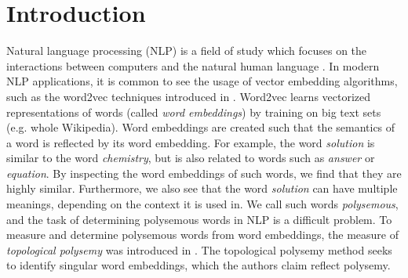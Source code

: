 \chapter{Introduction}
\label{chap:introduction}
Natural language processing (NLP) is a field of study which focuses on the interactions between computers and the natural human language \cite{Allen2003NLP}. In modern NLP applications, it is common to see the usage of vector embedding algorithms, such as the word2vec techniques introduced in \cite{mikolov2013a}. Word2vec learns vectorized representations of words (called \textit{word embeddings}) by training on big text sets (e.g. whole Wikipedia). Word embeddings are created such that the semantics of a word is reflected by its word embedding. For example, the word \textit{solution} is similar to the word \textit{chemistry}, but is also related to words such as \textit{answer} or \textit{equation}. By inspecting the word embeddings of such words, we find that they are highly similar. Furthermore, we also see that the word \textit{solution} can have multiple meanings, depending on the context it is used in. We call such words \textit{polysemous}, and the task of determining polysemous words in NLP is a difficult problem. To measure and determine polysemous words from word embeddings, the measure of \textit{topological polysemy} was introduced in \cite{jakubowski2020topology}. The topological polysemy method seeks to identify singular word embeddings, which the authors claim reflect polysemy.

